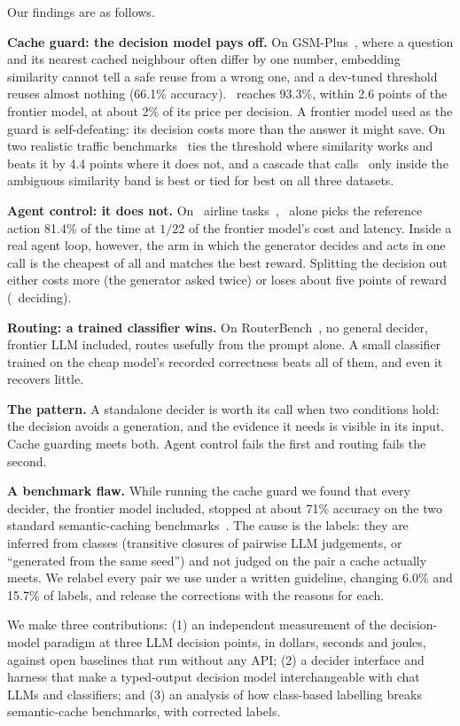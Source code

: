 Our findings are as follows.

\textbf{Cache guard: the decision model pays off.}
On GSM-Plus~\cite{li2024gsmplus}, where a question and its nearest cached neighbour often differ by one number, embedding similarity cannot tell a safe reuse from a wrong one, and a dev-tuned threshold reuses almost nothing (66.1\% accuracy).
\jev\ reaches 93.3\%, within 2.6 points of the frontier model, at about 2\% of its price per decision.
A frontier model used as the guard is self-defeating: its decision costs more than the answer it might save.
On two realistic traffic benchmarks \jev\ ties the threshold where similarity works and beats it by 4.4 points where it does not, and a cascade that calls \jev\ only inside the ambiguous similarity band is best or tied for best on all three datasets.

\textbf{Agent control: it does not.}
On \taubench\ airline tasks~\cite{barres2025tau2}, \jev\ alone picks the reference action 81.4\% of the time at $1/22$ of the frontier model's cost and latency.
Inside a real agent loop, however, the arm in which the generator decides and acts in one call is the cheapest of all and matches the best reward.
Splitting the decision out either costs more (the generator asked twice) or loses about five points of reward (\jev\ deciding).

\textbf{Routing: a trained classifier wins.}
On RouterBench~\cite{hu2024routerbench}, no general decider, frontier LLM included, routes usefully from the prompt alone.
A small classifier trained on the cheap model's recorded correctness beats all of them, and even it recovers little.

\textbf{The pattern.}
A standalone decider is worth its call when two conditions hold: the decision avoids a generation, and the evidence it needs is visible in its input.
Cache guarding meets both. Agent control fails the first and routing fails the second.

\textbf{A benchmark flaw.}
While running the cache guard we found that every decider, the frontier model included, stopped at about 71\% accuracy on the two standard semantic-caching benchmarks~\cite{schroeder2025vcache}.
The cause is the labels: they are inferred from classes (transitive closures of pairwise LLM judgements, or ``generated from the same seed'') and not judged on the pair a cache actually meets.
We relabel every pair we use under a written guideline, changing 6.0\% and 15.7\% of labels, and release the corrections with the reasons for each.

We make three contributions:
(1) an independent measurement of the decision-model paradigm at three LLM decision points, in dollars, seconds and joules, against open baselines that run without any API;
(2) a decider interface and harness that make a typed-output decision model interchangeable with chat LLMs and classifiers; and
(3) an analysis of how class-based labelling breaks semantic-cache benchmarks, with corrected labels.
